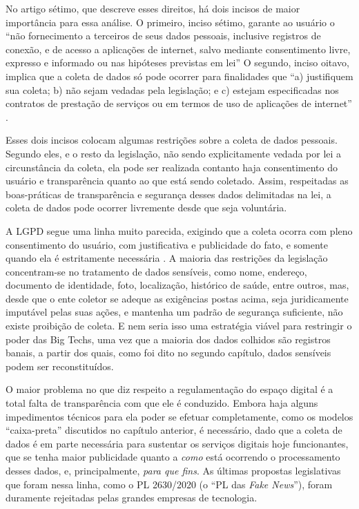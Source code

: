 No artigo sétimo, que descreve esses direitos, há dois incisos de maior importância para essa análise.
O primeiro, inciso sétimo, garante ao usuário o ``não fornecimento a terceiros de seus dados pessoais, inclusive registros de conexão, e de acesso a aplicações de internet, salvo mediante consentimento livre, expresso e informado ou nas hipóteses previstas em lei''
O segundo, inciso oitavo, implica que a coleta de dados só pode ocorrer para finalidades que ``a) justifiquem sua coleta; b) não sejam vedadas pela legislação; e c) estejam especificadas nos contratos de prestação de serviços ou em termos de uso de aplicações de internet'' \cite{brasil_lei_2014}.

Esses dois incisos colocam algumas restrições sobre a coleta de dados pessoais.
Segundo eles, e o resto da legislação, não sendo explicitamente vedada por lei a circunstância da coleta, ela pode ser realizada contanto haja consentimento do usuário e transparência quanto ao que está sendo coletado.
Assim, respeitadas as boas-práticas de transparência e segurança desses dados delimitadas na lei, a coleta de dados pode ocorrer livremente desde que seja voluntária.

A LGPD segue uma linha muito parecida, exigindo que a coleta ocorra com pleno consentimento do usuário, com justificativa e publicidade do fato, e somente quando ela é estritamente necessária \cite{brasil_lei_2018}.
A maioria das restrições da legislação concentram-se no tratamento de dados sensíveis, como nome, endereço, documento de identidade, foto, localização, histórico de saúde, entre outros, mas, desde que o ente coletor se adeque as exigências postas acima, seja juridicamente imputável pelas suas ações, e mantenha um padrão de segurança suficiente, não existe proibição de coleta.
E nem seria isso uma estratégia viável para restringir o poder das Big Techs, uma vez que a maioria dos dados colhidos são registros banais, a partir dos quais, como foi dito no segundo capítulo, dados sensíveis podem ser reconstituídos.

O maior problema no que diz respeito a regulamentação do espaço digital é a total falta de transparência com que ele é conduzido.
Embora haja alguns impedimentos técnicos para ela poder se efetuar completamente, como os modelos ``caixa-preta'' discutidos no capítulo anterior, é necessário, dado que a coleta de dados é em parte necessária para sustentar os serviços digitais hoje funcionantes, que se tenha maior publicidade quanto a \textit{como} está ocorrendo o processamento desses dados, e, principalmente, \textit{para que fins}.
As últimas propostas legislativas que foram nessa linha, como o PL 2630/2020 (o ``PL das \textit{Fake News}''), foram duramente rejeitadas pelas grandes empresas de tecnologia.

